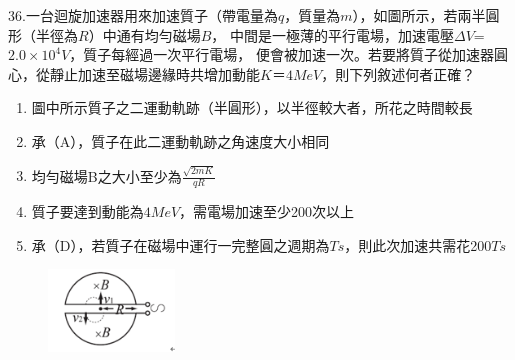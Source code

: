 \documentclass[cn,10pt,math=newtx]{elegantbook}
\begin{document}
\begin{example}
   36.一台迴旋加速器用來加速質子（帶電量為$q$，質量為$m$），如圖所示，若兩半圓形（半徑為$R$）中通有均勻磁場$B$，
  中間是一極薄的平行電場，加速電壓$\Delta V$=$2.0\times10^4V$，質子每經過一次平行電場，
   便會被加速一次。若要將質子從加速器圓心，從靜止加速至磁場邊緣時共增加動能$K$＝$4MeV$，則下列敘述何者正確？
   \begin{enumerate}[label=(\Alph*)]
     \item 圖中所示質子之二運動軌跡（半圓形），以半徑較大者，所花之時間較長
     \item 承（A），質子在此二運動軌跡之角速度大小相同
     \item 均勻磁場B之大小至少為$\frac{\sqrt{2mK}}{qR}$
     \item 質子要達到動能為$4MeV$，需電場加速至少200次以上
     \item 承（D），若質子在磁場中運行一完整圓之週期為$Ts$，則此次加速共需花200$Ts$ 
   \end{enumerate}
   
    \rightline{[成德高中教甄109]}
\end{example}
\begin{solution}
    
\end{solution}
\begin{figure}[htbp]
    \flushright
    \includegraphics[width=0.3\textwidth]{image/109成德36.png}
  \end{figure}
\newpage
\end{document}
